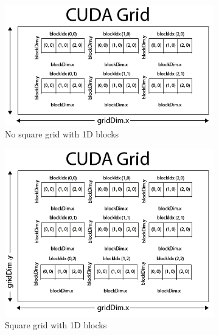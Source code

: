 \documentclass[a4paper]{article}
\begin{document}
\begin{figure}[!ht]
\begin{subfigure}{0.5\textwidth}
\centering
\includegraphics[width=\linewidth]{res/1D_no_square}
\caption{No square grid with 1D blocks}
\label{fig:ns1}
\end{subfigure} %
\begin{subfigure}{0.5\textwidth}
\centering
\includegraphics[width=\linewidth]{res/1D_square}
\caption{Square grid with 1D blocks}
\label{fig:s1}
\end{subfigure}
\begin{subfigure}{0.5\textwidth}
\centering

\end{subfigure}
\end{figure}
\end{document}
